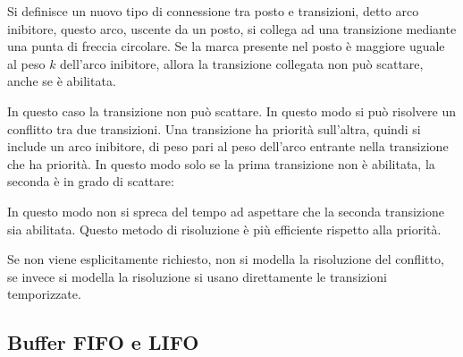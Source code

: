 \documentclass{article}
\numberwithin{equation}{subsection}
\begin{document}
Si definisce un nuovo tipo di connessione tra posto e transizioni, detto arco inibitore, questo arco, uscente da un posto, si collega ad una transizione mediante una punta di 
freccia circolare. Se la marca presente nel posto è maggiore uguale al peso $k$ dell'arco inibitore, allora la transizione collegata non può scattare, anche se è abilitata. 
\begin{center}
\end{center}
In questo caso la transizione non può scattare. In questo modo si può risolvere un conflitto tra due transizioni. Una transizione ha priorità sull'altra, quindi si include 
un arco inibitore, di peso pari al peso dell'arco entrante nella transizione che ha priorità. In questo modo solo se la prima transizione non è abilitata, la seconda è in 
grado di scattare:
\begin{center}
\end{center}
In questo modo non si spreca del tempo ad aspettare che la seconda transizione sia abilitata. Questo metodo di risoluzione è più efficiente rispetto alla priorità. 

Se non viene esplicitamente richiesto, non si modella la risoluzione del conflitto, se invece si modella la risoluzione si usano direttamente le transizioni temporizzate. 

\subsection{Buffer FIFO e LIFO}
\end{document}
